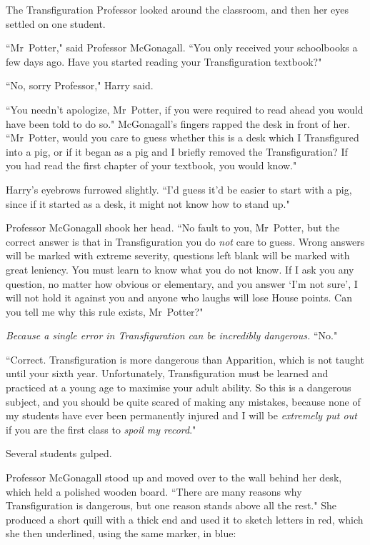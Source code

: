 The Transfiguration Professor looked around the classroom, and then her eyes settled on one student.

``Mr~Potter," said Professor McGonagall. ``You only received your schoolbooks a few days ago. Have you started reading your Transfiguration textbook?"

``No, sorry Professor," Harry said.

``You needn't apologize, Mr~Potter, if you were required to read ahead you would have been told to do so." McGonagall's fingers rapped the desk in front of her. ``Mr~Potter, would you care to guess whether this is a desk which I Transfigured into a pig, or if it began as a pig and I briefly removed the Transfiguration? If you had read the first chapter of your textbook, you would know."

Harry's eyebrows furrowed slightly. ``I'd guess it'd be easier to start with a pig, since if it started as a desk, it might not know how to stand up."

Professor McGonagall shook her head. ``No fault to you, Mr~Potter, but the correct answer is that in Transfiguration you do \emph{not} care to guess. Wrong answers will be marked with extreme severity, questions left blank will be marked with great leniency. You must learn to know what you do not know. If I ask you any question, no matter how obvious or elementary, and you answer `I'm not sure', I will not hold it against you and anyone who laughs will lose House points. Can you tell me why this rule exists, Mr~Potter?"

\emph{Because a single error in Transfiguration can be incredibly dangerous.} ``No."

``Correct. Transfiguration is more dangerous than Apparition, which is not taught until your sixth year. Unfortunately, Transfiguration must be learned and practiced at a young age to maximise your adult ability. So this is a dangerous subject, and you should be quite scared of making any mistakes, because none of my students have ever been permanently injured and I will be \emph{extremely put out} if you are the first class to \emph{spoil my record}."

Several students gulped.

Professor McGonagall stood up and moved over to the wall behind her desk, which held a polished wooden board. ``There are many reasons why Transfiguration is dangerous, but one reason stands above all the rest." She produced a short quill with a thick end and used it to sketch letters in red, which she then underlined, using the same marker, in blue:

